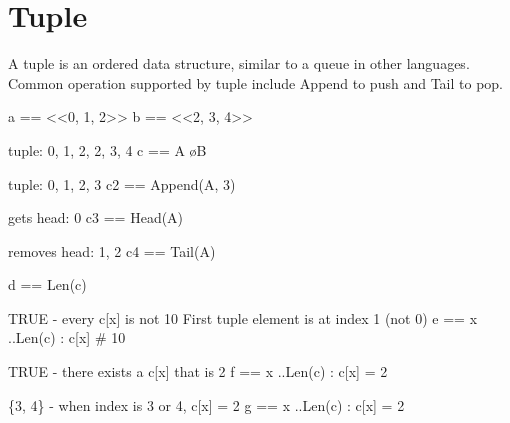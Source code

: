 \section{Tuple}

A tuple is an ordered data structure, similar to a queue in other languages.
Common operation supported by tuple include Append to push and Tail to pop.
\newline

\begin{tla}
a == <<0, 1, 2>>                    
b == <<2, 3, 4>>

\* tuple: 0, 1, 2, 2, 3, 4
c == A \o B

\* tuple: 0, 1, 2, 3
c2 == Append(A, 3) 

\* gets head: 0
c3 == Head(A) 

\* removes head: 1, 2
c4 == Tail(A) 

d == Len(c)                         

\* TRUE - every c[x] is not 10
\* First tuple element is at index 1 (not 0)
e == \A x ..Len(c) : c[x] # 10 

\* TRUE - there exists a c[x] that is 2
f == \E x ..Len(c) : c[x] = 2

\* \{3, 4\} - when index is 3 or 4, c[x] = 2
g == {x ..Len(c) : c[x] = 2}   
\end{tla}
\begin{tlatex}
%
%
\@pvspace{8.0pt}%
\@x{}%
%
\@xx{}%
%
\@pvspace{8.0pt}%
\@x{}%
%
\@xx{}%
%
\@pvspace{8.0pt}%
\@x{}%
%
\@xx{}%
%
\@pvspace{8.0pt}%
\@x{}%
%
\@xx{}%
%
\@pvspace{8.0pt}%
\@x{}%
%
\@xx{}%
%
\@pvspace{8.0pt}%
\@x{}%
%
\@xx{}%
\@x{}%
%
\@xx{}%
\@pvspace{8.0pt}%
\@x{}%
%
\@xx{}%
\@pvspace{8.0pt}%
\@x{}%
%
\@xx{}%
\end{tlatex}

